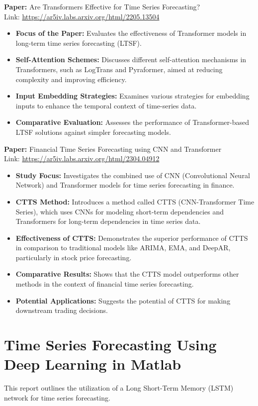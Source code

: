 \documentclass{article}
\begin{document}
\textbf{Paper:} Are Transformers Effective for Time Series Forecasting?\\
Link: \url{https://ar5iv.labs.arxiv.org/html/2205.13504}

\begin{itemize}
    \item \textbf{Focus of the Paper:} Evaluates the effectiveness of Transformer models in long-term time series forecasting (LTSF).
    \item \textbf{Self-Attention Schemes:} Discusses different self-attention mechanisms in Transformers, such as LogTrans and Pyraformer, aimed at reducing complexity and improving efficiency.
    \item \textbf{Input Embedding Strategies:} Examines various strategies for embedding inputs to enhance the temporal context of time-series data.
    \item \textbf{Comparative Evaluation:} Assesses the performance of Transformer-based LTSF solutions against simpler forecasting models.
\end{itemize}

\textbf{Paper:} Financial Time Series Forecasting using CNN and Transformer\\
Link: \url{https://ar5iv.labs.arxiv.org/html/2304.04912}

\begin{itemize}
    \item \textbf{Study Focus:} Investigates the combined use of CNN (Convolutional Neural Network) and Transformer models for time series forecasting in finance.
    \item \textbf{CTTS Method:} Introduces a method called CTTS (CNN-Transformer Time Series), which uses CNNs for modeling short-term dependencies and Transformers for long-term dependencies in time series data.
    \item \textbf{Effectiveness of CTTS:} Demonstrates the superior performance of CTTS in comparison to traditional models like ARIMA, EMA, and DeepAR, particularly in stock price forecasting.
    \item \textbf{Comparative Results:} Shows that the CTTS model outperforms other methods in the context of financial time series forecasting.
    \item \textbf{Potential Applications:} Suggests the potential of CTTS for making downstream trading decisions.
\end{itemize}

\section{Time Series Forecasting Using Deep Learning in Matlab} 
This report outlines the utilization of a Long Short-Term Memory (LSTM) network for time series forecasting.
\end{document}
